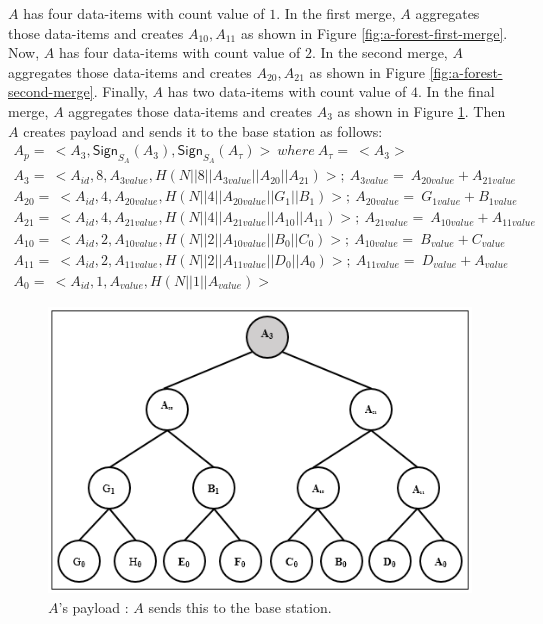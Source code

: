 		$A$ has four data-items with count value of $1$.
		In the first merge, $A$ aggregates those data-items and creates $A_{10},A_{11}$ as shown in Figure \ref{fig:a-forest-first-merge}.
		Now, $A$ has four data-items with count value of $2$.
		In the second merge, $A$ aggregates those data-items and creates $A_{20},A_{21}$ as shown in Figure \ref{fig:a-forest-second-merge}.
		Finally, $A$ has two data-items with count value of $4$.
		In the final merge, $A$ aggregates those data-items and creates $A_{3}$ as shown in Figure \ref{fig:a-payload}.
		Then $A$ creates payload and sends it to the base station as follows:
		\begin{equation}
			\begin{array}{l}
				A_{p} =\ <A_{3},\textsf{Sign}_{S_{A}}(A_{3}),\textsf{Sign}_{S_{A}}(A_{\tau})>\ where\ A_{\tau} =\ <A_{3}>\\
				A_{3} =\ <A_{id}, 8, A_{3value}, H(N||8||A_{3value}||A_{20}||A_{21})>;\ A_{3value} =\ A_{20value} + A_{21value}\\
				A_{20} =\ <A_{id},4,A_{20value},H(N||4||A_{20value}||G_{1}||B_{1})>;\ A_{20value} =\ G_{1value} + B_{1value}\\ 
				A_{21} =\ <A_{id},4,A_{21value},H(N||4||A_{21value}||A_{10}||A_{11})>;\ A_{21value} =\ A_{10value} + A_{11value}\\ 
				A_{10} =\ <A_{id},2,A_{10value},H(N||2||A_{10value}||B_{0}||C_{0})>;\ A_{10value} =\ B_{value} + C_{value}\\
				A_{11} =\ <A_{id},2,A_{11value},H(N||2||A_{11value}||D_{0}||A_{0})>;\ A_{11value} =\ D_{value} + A_{value}\\
				A_{0} =\ <A_{id},1,A_{value},H(N||1||A_{value})>
			\end{array}
		\end{equation}
		\begin{figure}[h!]
			\centering
			\includegraphics{images/a-payload.png}
			\caption{$A$'s payload : $A$ sends this to the base station.}
			\label{fig:a-payload}
		\end{figure}

